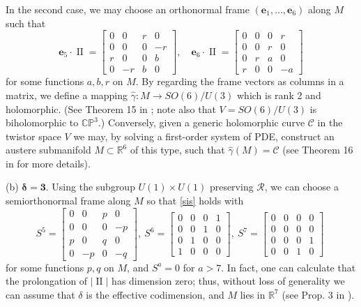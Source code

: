 \documentclass[12pt,reqno]{amsart}
\theoremstyle{definition}
\theoremstyle{remark}
\begin{document}
In the second case, we may choose an orthonormal
frame $({\mathbf e}_1, \ldots, {\mathbf e}_6)$ along $M$ such that
$${\mathbf e}_5 \cdot {\operatorname{II}} = \begin{bmatrix} 0 & 0 &r & 0 \\ 0 & 0 & 0 & -r \\ r& 0 & 0 & b\\ 0 & -r & b &0\end{bmatrix},\quad
{\mathbf e}_6 \cdot {\operatorname{II}} = \begin{bmatrix} 0 & 0& 0 & r \\ 0 & 0 &r & 0\\ 0 & r & a & 0  \\ r & 0 & 0 & -a\end{bmatrix}$$
for some functions $a,b,r$ on $M$.
By regarding the frame vectors as columns in a matrix, we define a mapping
${\widehat{\gamma}}: M \to SO(6)/U(3)$ which is rank 2 and holomorphic.  (See Theorem 15 in \cite{ayeaye}; note also
that $V=SO(6)/U(3)$ is biholomorphic to ${\mathbb{CP}}^3$.)
Conversely, given a generic holomorphic curve ${\mathscr C}$ in the twistor space $V$
we may, by solving a first-order system of PDE, construct an austere submanifold $M\subset {\mathbb R}^6$
of this type, such that ${\widehat{\gamma}}(M)={\mathscr C}$
(see Theorem 16 in \cite{ayeaye} for more details).

\medskip
(b) $\boldsymbol{\delta=3}$.
Using the subgroup $U(1)\times U(1)$ preserving ${\mathcal R}$, we can choose a semiorthonormal
frame along $M$ so that \eqref{sis} holds with
$$
S^5 = \begin{bmatrix} 0 & 0 & p & 0 \\ 0 & 0 & 0 & -p \\ p & 0 & q & 0 \\ 0 & -p & 0 &-q \end{bmatrix},\
S^6 = \begin{bmatrix} 0 & 0 & 0 & 1 \\ 0 & 0 & 1 & 0\\ 0 & 1 & 0 & 0\\ 1 & 0 & 0 & 0\end{bmatrix},\
S^7 = \begin{bmatrix} 0 & 0 & 0 & 0  \\  0 & 0 & 0 & 0  \\ 0 & 0 & 0 & 1\\ 0 & 0 & 1 & 0 \end{bmatrix}\
$$
for some functions $p,q$ on $M$,
and $S^a=0$ for $a > 7$.  In fact, one can calculate that the prolongation of $|{\operatorname{II}}|$ has dimension zero;
thus, without loss of generality we can assume that $\delta$ is the
effective codimension, and $M$ lies in ${\mathbb R}^7$ (see Prop. 3 in \cite{ayeaye}).
\end{document}
